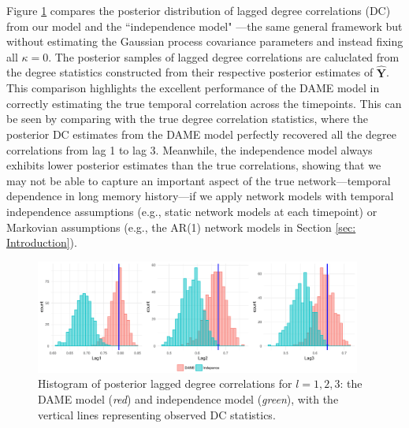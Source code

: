 \documentclass[a4paper]{article}
\begin{document}
 Figure \ref{figure:correlationstudy} compares the posterior distribution of lagged degree correlations (DC) from our model and the ``independence model" ---the same general framework but without estimating the Gaussian process covariance parameters and instead fixing all $\kappa = 0$. The posterior samples of lagged degree correlations are caluclated from the degree statistics constructed from their respective posterior estimates of $\hat{\mathbf{Y}}$. This comparison highlights the excellent performance of the DAME model in correctly estimating the true temporal correlation across the timepoints. This can be seen by comparing with the true degree correlation statistics, where the posterior DC estimates from the DAME model perfectly recovered all the degree correlations from lag 1 to lag 3. Meanwhile, the independence model always exhibits lower posterior estimates than the true correlations, showing that we may not be able to capture an important aspect of the true network---temporal dependence in long memory history---if we apply network models with temporal independence assumptions (e.g., static network models at each timepoint) or Markovian assumptions (e.g., the AR(1) network models in Section \ref{sec: Introduction}).
\begin{figure}[b]
	\centering
		\includegraphics[width=0.955\textwidth]{plots_paper/correlations-1.png}	
	\caption {Histogram of posterior lagged degree correlations for $l=1,2,3$: the DAME model (\textit{red}) and independence model (\textit{green}), with the vertical lines representing observed DC statistics.}
	\label{figure:correlationstudy}
\end{figure}
\end{document}
